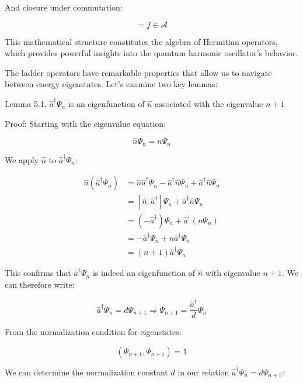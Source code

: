 \documentclass[italian]{HKNdocument}
\begin{document}
And closure under commutation:

\begin{equation*}
[b,c] = f \in \mathcal{A} \tag{5.21}
\end{equation*}

This mathematical structure constitutes the algebra of Hermitian operators, which provides powerful insights into the quantum harmonic oscillator's behavior.

The ladder operators have remarkable properties that allow us to navigate between energy eigenstates. Let's examine two key lemmas:

Lemma 5.1. $\hat{a}^\dagger\Psi_n$ is an eigenfunction of $\hat{n}$ associated with the eigenvalue $n+1$

Proof:
Starting with the eigenvalue equation:

\begin{equation*}
\hat{n}\Psi_n = n\Psi_n \tag{5.22}
\end{equation*}

We apply $\hat{n}$ to $\hat{a}^\dagger\Psi_n$:

\begin{align*}
\hat{n}(\hat{a}^\dagger\Psi_n) &= \hat{n}\hat{a}^\dagger\Psi_n - \hat{a}^\dagger\hat{n}\Psi_n + \hat{a}^\dagger\hat{n}\Psi_n \\
&= [\hat{n}, \hat{a}^\dagger]\Psi_n + \hat{a}^\dagger\hat{n}\Psi_n \\
&= (-\hat{a}^\dagger)\Psi_n + \hat{a}^\dagger(n\Psi_n) \tag{5.23} \\
&= -\hat{a}^\dagger\Psi_n + n\hat{a}^\dagger\Psi_n \\
&= (n+1)\hat{a}^\dagger\Psi_n
\end{align*}

This confirms that $\hat{a}^\dagger\Psi_n$ is indeed an eigenfunction of $\hat{n}$ with eigenvalue $n+1$. We can therefore write:

\begin{equation*}
\hat{a}^\dagger\Psi_n = d\Psi_{n+1} \Longrightarrow \Psi_{n+1} = \frac{\hat{a}^\dagger}{d}\Psi_n \tag{5.24}
\end{equation*}


From the normalization condition for eigenstates:

\begin{equation*}
(\Psi_{n+1}, \Psi_{n+1}) = 1 \tag{5.25}
\end{equation*}

We can determine the normalization constant $d$ in our relation $\hat{a}^\dagger\Psi_n = d\Psi_{n+1}$:
\end{document}
